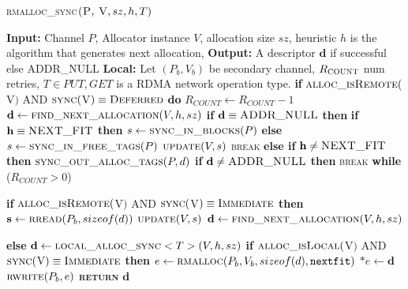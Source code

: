 \documentclass[10pt]{article}
\begin{document}
\begin{algorithm}{}
\footnotesize
\caption{\textsc{rmalloc\_sync}{$\textsc{(P, V}, sz, h, T)$}}
\label{alg:rmalloc_sync} 
\begin{algorithmic}[1]


\STATE \textbf{Input:} Channel $P$, Allocator instance $V$, allocation size $sz$, heuristic $h$
is the algorithm that generates next allocation, 
\STATE \textbf{Output:} A descriptor {$\textbf{d}$} if successful else \textsc{ADDR\_NULL}
\STATE \textbf{Local:} Let $(P_{b}, V_{b})$ be secondary channel, $R_{\textsc{COUNT}}$ num retries, $T\in {PUT, GET}$ is a RDMA network operation type.
\STATE \textbf{if} $\textsc{alloc\_isRemote}($V$)$ AND $\textsc{sync}($V$) \equiv \textsc{Deferred}$ 
\STATE \quad \textbf{do}
\STATE \qquad $R_{COUNT} \gets R_{COUNT}-1$
\STATE \qquad $\textbf{d} \leftarrow  \textsc{find\_next\_allocation}(V, h, sz)$ 
\STATE \qquad \textbf{if} $\textbf{d} \equiv \textsc{ADDR\_NULL}$ \textbf{then}
\STATE \qquad \quad \textbf{if} $\textbf{h} \equiv \textsc{NEXT\_FIT}$ \textbf{then}
\STATE \qquad \qquad $s \gets \textsc{sync\_in\_blocks}(P)$
\STATE \qquad \quad\textbf{else} 
\STATE \qquad \qquad $s \gets \textsc{sync\_in\_free\_tags}(P)$
\STATE \qquad \quad $\textsc{update}(V, s)$
\STATE \qquad \quad \textsc{break}
\STATE \qquad \textbf{else if}  $\textbf{h} \neq \textsc{NEXT\_FIT}$ \textbf{then}
\STATE \qquad \quad $\textsc{sync\_out\_alloc\_tags}(P, d)$
\STATE \qquad \textbf{if}  $\textbf{d} \neq \textsc{ADDR\_NULL}$ \textbf{then}
\STATE \qquad \quad \textsc{break}
\STATE \quad \textbf{while} ($R_{COUNT} > 0$)

\STATE \textbf{if} $\textsc{alloc\_isRemote}($V$)$ AND $\textsc{sync}($V$) \equiv \textsc{Immediate}$ \textbf{then}
\STATE \quad $\textbf{s} \gets \textsc{rread}(P_{b}, sizeof(d))$ 
\STATE \quad $\textsc{update}(V, s)$
\STATE \quad $\textbf{d} \gets \textsc{find\_next\_allocation}(V, h, sz)$ 

\STATE \textbf{else}
\STATE \quad $\textbf{d} \gets \textsc{local\_alloc\_sync}<T>(V, h, sz)$ 
\STATE \quad \textbf{if} $\textsc{alloc\_isLocal}($V$)$ AND $\textsc{sync}($V$) \equiv \textsc{Immediate}$ \textbf{then}
\STATE \qquad $e \gets \textsc{rmalloc}(P_{b}, V_{b}, sizeof(d), \texttt{nextfit})$
\STATE \qquad $*e \gets \textbf{d}$
\STATE \qquad $\textsc{rwrite}(P_{b}, e)$ 
\STATE \textsc{\textbf{return}} {$\textbf{d}$}

\end{algorithmic}
\end{algorithm}
\end{document}
